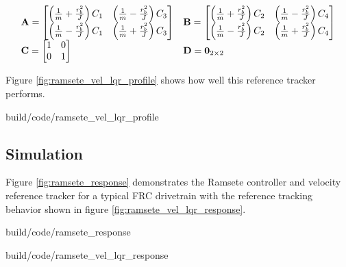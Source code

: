 \begin{equation}
  \begin{array}{ll}
    \mathbf{A} =
    \begin{bmatrix}
      \left(\frac{1}{m} + \frac{r_b^2}{J}\right) C_1 & \left(\frac{1}{m} - \frac{r_b^2}{J}\right) C_3 \\
      \left(\frac{1}{m} - \frac{r_b^2}{J}\right) C_1 & \left(\frac{1}{m} + \frac{r_b^2}{J}\right) C_3
    \end{bmatrix} &
    \mathbf{B} =
    \begin{bmatrix}
      \left(\frac{1}{m} + \frac{r_b^2}{J}\right) C_2 & \left(\frac{1}{m} - \frac{r_b^2}{J}\right) C_4 \\
      \left(\frac{1}{m} - \frac{r_b^2}{J}\right) C_2 & \left(\frac{1}{m} + \frac{r_b^2}{J}\right) C_4
    \end{bmatrix} \\
    \mathbf{C} =
    \begin{bmatrix}
      1 & 0 \\
      0 & 1 \\
    \end{bmatrix} &
    \mathbf{D} = \mathbf{0}_{2 \times 2}
  \end{array}
\end{equation}

Figure \ref{fig:ramsete_vel_lqr_profile} shows how well this \gls{reference}
tracker performs.

\begin{svg}{build/code/ramsete_vel_lqr_profile}
  \caption{Velocity reference tracker response to a motion profile}
  \label{fig:ramsete_vel_lqr_profile}
\end{svg}

\subsection{Simulation}

Figure \ref{fig:ramsete_response} demonstrates the Ramsete controller and
velocity \gls{reference} tracker for a typical FRC drivetrain with the
\gls{reference} tracking behavior shown in figure
\ref{fig:ramsete_vel_lqr_response}.

\begin{bookfigure}
  \begin{minisvg}{build/code/ramsete_response}
    \caption{Ramsete controller response ($b = 2$, $\zeta = 0.7$)}
    \label{fig:ramsete_response}
  \end{minisvg}
  \hfill
  \begin{minisvg}{build/code/ramsete_vel_lqr_response}
    \caption{Ramsete controller's velocity reference tracker response}
    \label{fig:ramsete_vel_lqr_response}
  \end{minisvg}
\end{bookfigure}

